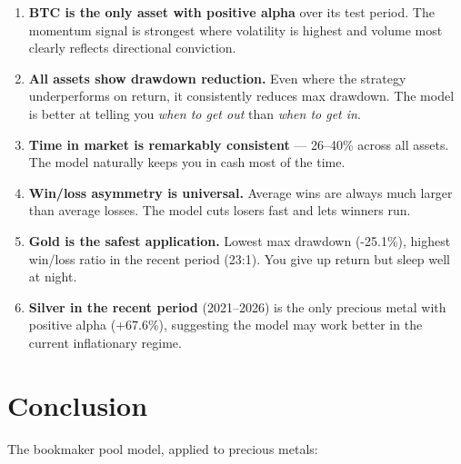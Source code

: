 \documentclass[11pt,a4paper]{article}
\begin{document}
\begin{enumerate}[leftmargin=2em]
    \item \textbf{BTC is the only asset with positive alpha} over its
          test period. The momentum signal is strongest where
          volatility is highest and volume most clearly reflects
          directional conviction.

    \item \textbf{All assets show drawdown reduction.} Even where the
          strategy underperforms on return, it consistently reduces
          max drawdown. The model is better at telling you
          \emph{when to get out} than \emph{when to get in}.

    \item \textbf{Time in market is remarkably consistent} --- 26--40\%
          across all assets. The model naturally keeps you in cash
          most of the time.

    \item \textbf{Win/loss asymmetry is universal.} Average wins are
          always much larger than average losses. The model cuts
          losers fast and lets winners run.

    \item \textbf{Gold is the safest application.} Lowest max
          drawdown (-25.1\%), highest win/loss ratio in the recent
          period (23:1). You give up return but sleep well at night.

    \item \textbf{Silver in the recent period} (2021--2026) is the
          only precious metal with positive alpha (+67.6\%), suggesting
          the model may work better in the current inflationary regime.
\end{enumerate}


\section{Conclusion}

The bookmaker pool model, applied to precious metals:
\end{document}
